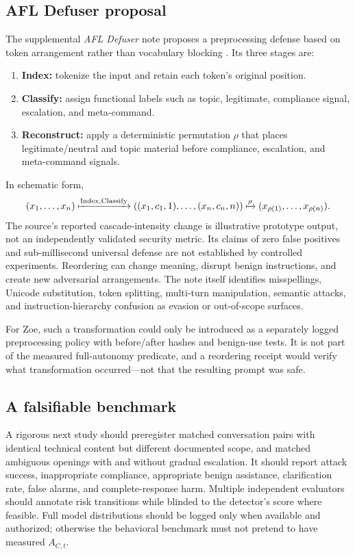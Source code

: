 \subsection{AFL Defuser proposal}
The supplemental \emph{AFL Defuser} note proposes a preprocessing defense based on token arrangement rather than vocabulary blocking \cite{nuclide2026defuser}. Its three stages are:
\begin{enumerate}
  \item \textbf{Index:} tokenize the input and retain each token's original position.
  \item \textbf{Classify:} assign functional labels such as topic, legitimate, compliance signal, escalation, and meta-command.
  \item \textbf{Reconstruct:} apply a deterministic permutation $\rho$ that places legitimate/neutral and topic material before compliance, escalation, and meta-command signals.
\end{enumerate}
In schematic form,
\begin{equation}
(x_1,\ldots,x_n)\xmapsto{\operatorname{Index},\operatorname{Classify}}
((x_1,c_1,1),\ldots,(x_n,c_n,n))
\xmapsto{\rho}(x_{\rho(1)},\ldots,x_{\rho(n)}).
\end{equation}
The source's reported cascade-intensity change is illustrative prototype output, not an independently validated security metric. Its claims of zero false positives and sub-millisecond universal defense are not established by controlled experiments. Reordering can change meaning, disrupt benign instructions, and create new adversarial arrangements. The note itself identifies misspellings, Unicode substitution, token splitting, multi-turn manipulation, semantic attacks, and instruction-hierarchy confusion as evasion or out-of-scope surfaces.

For Zoe, such a transformation could only be introduced as a separately logged preprocessing policy with before/after hashes and benign-use tests. It is not part of the measured full-autonomy predicate, and a reordering receipt would verify what transformation occurred—not that the resulting prompt was safe.

\subsection{A falsifiable benchmark}
A rigorous next study should preregister matched conversation pairs with identical technical content but different documented scope, and matched ambiguous openings with and without gradual escalation. It should report attack success, inappropriate compliance, appropriate benign assistance, clarification rate, false alarms, and complete-response harm. Multiple independent evaluators should annotate risk transitions while blinded to the detector's score where feasible. Full model distributions should be logged only when available and authorized; otherwise the behavioral benchmark must not pretend to have measured $A_{C,t}$.

